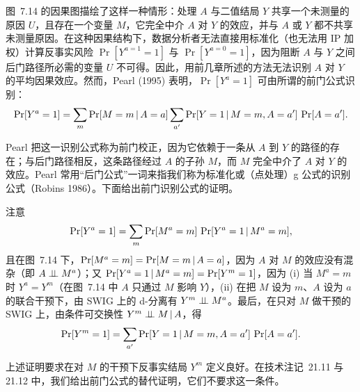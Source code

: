 \begin{techpoint}[前门准则]
图~7.14 的因果图描绘了这样一种情形：处理 $A$ 与二值结局 $Y$ 共享一个未测量的原因 $U$，且存在一个变量 $M$，它完全中介 $A$ 对 $Y$ 的效应，并与 $A$ 或 $Y$ 都不共享未测量原因。在这种因果结构下，数据分析者无法直接用标准化（也无法用 IP 加权）计算反事实风险 $\Pr[Y^{a=1}=1]$ 与 $\Pr[Y^{a=0}=1]$，因为阻断 $A$ 与 $Y$ 之间后门路径所必需的变量 $U$ 不可得。因此，用前几章所述的方法无法识别 $A$ 对 $Y$ 的平均因果效应。然而，Pearl (1995) 表明，$\Pr[Y^{a}=1]$ 可由所谓的前门公式识别：
\[
\Pr[Y^{a}=1]=\sum_m \Pr[M=m\,|\, A=a]\sum_{a'}\Pr[Y=1\,|\, M=m,A=a']\,\Pr[A=a'].
\]

Pearl 把这一识别公式称为前门校正，因为它依赖于一条从 $A$ 到 $Y$ 的路径的存在；与后门路径相反，这条路径经过 $A$ 的子孙 $M$，而 $M$ 完全中介了 $A$ 对 $Y$ 的效应。Pearl 常用“后门公式”一词来指我们称为标准化或（点处理）g 公式的识别公式（Robins 1986）。下面给出前门识别公式的证明。

注意
\[
\Pr[Y^{a}=1]=\sum_m \Pr[M^{a}=m]\,\Pr[Y^{a}=1\,|\, M^{a}=m],
\]
且在图~7.14 下，$\Pr[M^{a}=m]=\Pr[M=m\,|\, A=a]$，因为 $A$ 对 $M$ 的效应没有混杂（即 $A\perp\!\!\!\perp M^{a}$）；又 $\Pr[Y^{a}=1\,|\, M^{a}=m]=\Pr[Y^{m}=1]$，因为 (i) 当 $M^{a}=m$ 时 $Y^{a}=Y^{m}$（在图~7.14 中 $A$ 只通过 $M$ 影响 $Y$），(ii) 在把 $M$ 设为 $m$、$A$ 设为 $a$ 的联合干预下，由 SWIG 上的 d-分离有 $Y^{m}\perp\!\!\!\perp M^{a}$。最后，在只对 $M$ 做干预的 SWIG 上，由条件可交换性 $Y^{m}\perp\!\!\!\perp M\,|\, A$，得
\[
\Pr[Y^{m}=1]=\sum_{a'}\Pr[Y=1\,|\, M=m,A=a']\,\Pr[A=a'].
\]

上述证明要求在对 $M$ 的干预下反事实结局 $Y^{m}$ 定义良好。在技术注记~21.11 与 21.12 中，我们给出前门公式的替代证明，它们不要求这一条件。
\end{techpoint}

